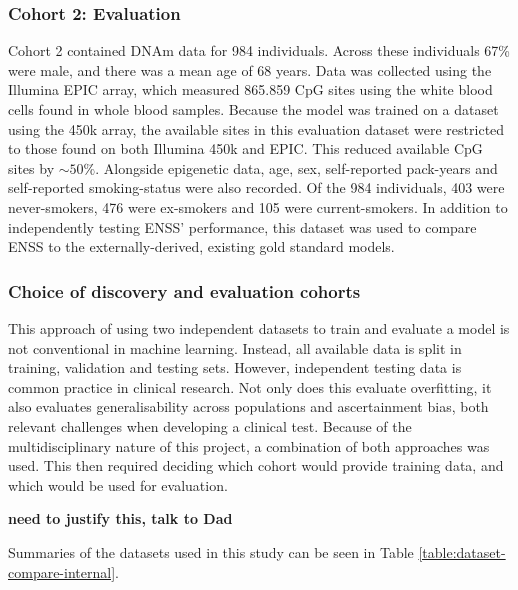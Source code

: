 \documentclass{article} %
\begin{document}
\subsubsection{Cohort 2: Evaluation}
Cohort 2 contained DNAm data for 984 individuals. Across these individuals 67\% were male, and there was a mean age of 68 years. Data was collected using the Illumina EPIC array, which measured \num{865,859} CpG sites using the white blood cells found in whole blood samples. Because the model was trained on a dataset using the 450k array, the available sites in this evaluation dataset were restricted to those found on both Illumina 450k and EPIC. This reduced available CpG sites by \(\sim\!50\%\). Alongside epigenetic data, age, sex, self-reported pack-years and self-reported smoking-status were also recorded. Of the 984 individuals, 403 were never-smokers, 476 were ex-smokers and 105 were current-smokers. In addition to independently testing ENSS' performance, this dataset was used to compare ENSS to the externally-derived, existing gold standard models.

\subsubsection{Choice of discovery and evaluation cohorts}
This approach of using two independent datasets to train and evaluate a model is not conventional in machine learning. Instead, all available data is split in training, validation and testing sets. However, independent testing data is common practice in clinical research. Not only does this evaluate overfitting, it also evaluates generalisability across populations and ascertainment bias, both relevant challenges when developing a clinical test. Because of the multidisciplinary nature of this project, a combination of both approaches was used. This then required deciding which cohort would provide training data, and which would be used for evaluation.

\textbf{need to justify this, talk to Dad}

Summaries of the datasets used in this study can be seen in Table \ref{table:dataset-compare-internal}.

\end{document}
